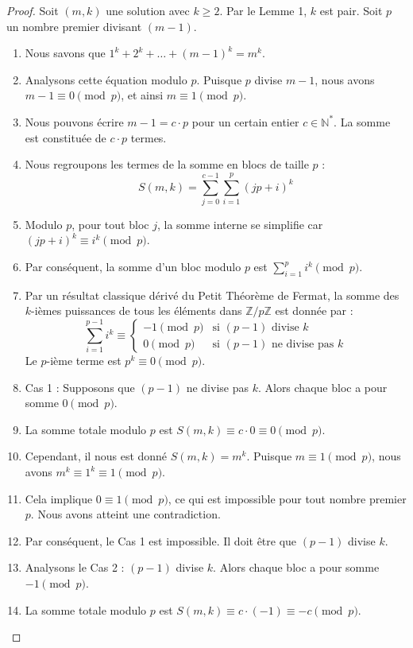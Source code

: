\documentclass[11pt,a4paper]{article}
\begin{document}
\begin{proof}
Soit $(m, k)$ une solution avec $k \ge 2$. Par le Lemme 1, $k$ est pair. Soit $p$ un nombre premier divisant $(m-1)$.
\begin{enumerate}
    \item Nous savons que $1^k + 2^k + \dots + (m-1)^k = m^k$.
    \item Analysons cette équation modulo $p$. Puisque $p$ divise $m-1$, nous avons $m-1 \equiv 0 \pmod p$, et ainsi $m \equiv 1 \pmod p$.
    \item Nous pouvons écrire $m-1 = c \cdot p$ pour un certain entier $c \in \mathbb{N}^*$. La somme est constituée de $c \cdot p$ termes.
    \item Nous regroupons les termes de la somme en blocs de taille $p$ :
    $$S(m, k) = \sum_{j=0}^{c-1} \sum_{i=1}^{p} (jp + i)^k$$
    \item Modulo $p$, pour tout bloc $j$, la somme interne se simplifie car $(jp + i)^k \equiv i^k \pmod p$.
    \item Par conséquent, la somme d'un bloc modulo $p$ est $\sum_{i=1}^{p} i^k \pmod p$.
    \item Par un résultat classique dérivé du Petit Théorème de Fermat, la somme des $k$-ièmes puissances de tous les éléments dans $\mathbb{Z}/p\mathbb{Z}$ est donnée par :
    $$\sum_{i=1}^{p-1} i^k \equiv \begin{cases} -1 \pmod p & \text{si } (p-1) \text{ divise } k \\ 0 \pmod p & \text{si } (p-1) \text{ ne divise pas } k \end{cases}$$
    Le $p$-ième terme est $p^k \equiv 0 \pmod p$.
    \item Cas 1 : Supposons que $(p-1)$ ne divise pas $k$. Alors chaque bloc a pour somme $0 \pmod p$.
    \item La somme totale modulo $p$ est $S(m, k) \equiv c \cdot 0 \equiv 0 \pmod p$.
    \item Cependant, il nous est donné $S(m, k) = m^k$. Puisque $m \equiv 1 \pmod p$, nous avons $m^k \equiv 1^k \equiv 1 \pmod p$.
    \item Cela implique $0 \equiv 1 \pmod p$, ce qui est impossible pour tout nombre premier $p$. Nous avons atteint une contradiction.
    \item Par conséquent, le Cas 1 est impossible. Il doit être que $(p-1)$ divise $k$.
    \item Analysons le Cas 2 : $(p-1)$ divise $k$. Alors chaque bloc a pour somme $-1 \pmod p$.
    \item La somme totale modulo $p$ est $S(m, k) \equiv c \cdot (-1) \equiv -c \pmod p$.

\end{enumerate}
\end{proof}
\end{document}
